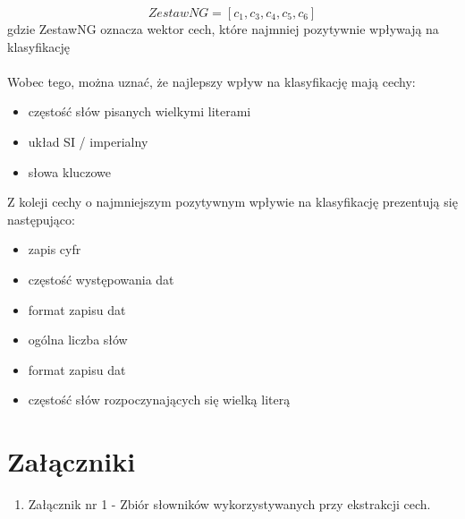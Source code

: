 \documentclass{classrep}
\begin{document}
\begin{equation}
ZestawNG = [c_{1}, c_{3}, c_{4}, c_{5}, c_{6}]
\end{equation} 
	\indent gdzie ZestawNG oznacza wektor cech, które najmniej pozytywnie wpływają na klasyfikację \\ 
\\ Wobec tego, można uznać, że najlepszy wpływ na klasyfikację mają cechy: 
\begin{itemize}
    \item częstość słów pisanych wielkymi literami
    \item układ SI / imperialny
    \item słowa kluczowe
\end{itemize}
Z koleji cechy o najmniejszym pozytywnym wpływie na klasyfikację prezentują się następująco:
\begin{itemize}
    \item zapis cyfr
    \item częstość występowania dat
    \item format zapisu dat
    \item ogólna liczba słów
    \item format zapisu dat
    \item częstość słów rozpoczynających się wielką literą
\end{itemize}


\section*{Załączniki}
\begin{enumerate}
   \item Załącznik nr 1 - Zbiór słowników wykorzystywanych przy ekstrakcji cech.
\end{enumerate}
\end{document}

